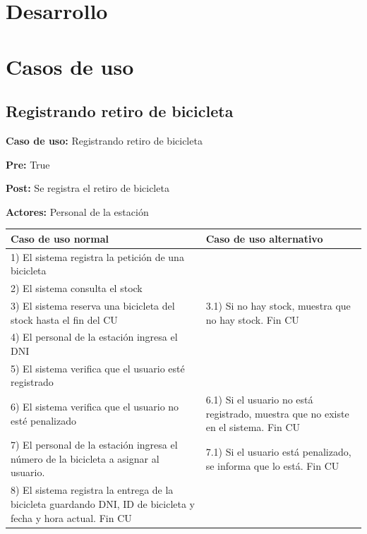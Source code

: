 \documentclass[a4paper, 10pt, twoside]{article}
\begin{document}
\vspace{2cm}








\section{Desarrollo}




\section{Casos de uso}

\subsection{Registrando retiro de bicicleta}

\textbf{Caso de uso:} Registrando retiro de bicicleta

\textbf{Pre:} True

\textbf{Post:} Se registra el retiro de bicicleta

\textbf{Actores:} Personal de la estación
\\

\begin{tabular}{| p{7cm} | p{7cm} |}
	\hline
	Caso de uso normal & Caso de uso alternativo \\ \hline
	1) El sistema registra la petición de una bicicleta &  \\ \hline
	2) El sistema consulta el stock & \\ \hline
	3) El sistema reserva una bicicleta del stock hasta el fin del CU & 3.1) Si no hay stock, muestra que no hay stock. Fin CU \\ \hline
	4) El personal de la estación ingresa el DNI & \\ \hline
	5) El sistema verifica que el usuario esté registrado & \\ \hline
	6) El sistema verifica que el usuario no esté penalizado & 6.1) Si el usuario no está registrado, muestra que no existe en el sistema. Fin CU \\ \hline
	7) El personal de la estación ingresa el número de la bicicleta a asignar al usuario. & 7.1) Si el usuario está penalizado, se informa que lo está. Fin CU \\ \hline
	8) El sistema registra la entrega de la bicicleta guardando DNI, ID de bicicleta y fecha y hora actual. Fin CU & \\
	\hline
\end{tabular}
\end{document}
